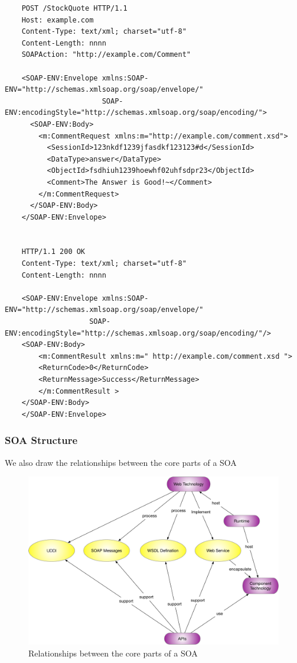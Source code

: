 \documentclass[runningheads]{llncs}
\begin{document}
\begin{lstlisting}
    POST /StockQuote HTTP/1.1
    Host: example.com
    Content-Type: text/xml; charset="utf-8"
    Content-Length: nnnn
    SOAPAction: "http://example.com/Comment"
     
    <SOAP-ENV:Envelope xmlns:SOAP-ENV="http://schemas.xmlsoap.org/soap/envelope/"
                       SOAP-ENV:encodingStyle="http://schemas.xmlsoap.org/soap/encoding/">
      <SOAP-ENV:Body>
        <m:CommentRequest xmlns:m="http://example.com/comment.xsd">
          <SessionId>123nkdf1239jfasdkf123123#d</SessionId>
          <DataType>answer</DataType>
          <ObjectId>fsdhiuh1239hoewhf02uhfsdpr23</ObjectId>
          <Comment>The Answer is Good!~</Comment>
        </m:CommentRequest>
      </SOAP-ENV:Body>
    </SOAP-ENV:Envelope>


    HTTP/1.1 200 OK
    Content-Type: text/xml; charset="utf-8"
    Content-Length: nnnn
    
    <SOAP-ENV:Envelope xmlns:SOAP-ENV="http://schemas.xmlsoap.org/soap/envelope/"
                    SOAP-ENV:encodingStyle="http://schemas.xmlsoap.org/soap/encoding/"/>
    <SOAP-ENV:Body>
        <m:CommentResult xmlns:m=" http://example.com/comment.xsd ">
        <ReturnCode>0</ReturnCode>
        <ReturnMessage>Success</ReturnMessage>
        </m:CommentResult >
    </SOAP-ENV:Body>
    </SOAP-ENV:Envelope>

\end{lstlisting}

\subsubsection{SOA Structure}
We also draw the relationships between the core parts of a SOA
\begin{figure}[H]
  \centering %
  \includegraphics[width=1.0\textwidth]{./figure/MWZH/corepartssoa} %
  \caption{Relationships between the core parts of a SOA} %
  \label{wsc} %
\end{figure}

\end{document}
